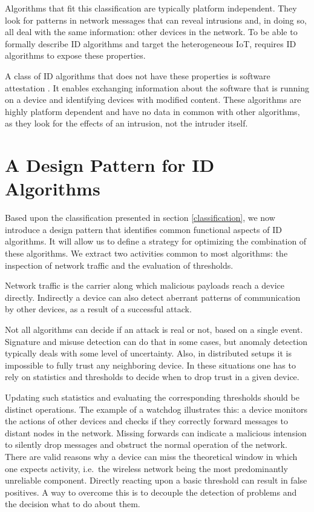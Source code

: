 \documentclass[3p,times,procedia]{elsarticle}
\begin{document}
Algorithms that fit this classification are typically platform independent.
They look for patterns in network messages that can reveal intrusions and, in
doing so, all deal with the same information: other devices in the network. To
be able to formally describe ID algorithms and target the heterogeneous IoT,
\NAME requires ID algorithms to expose these properties.

A class of ID algorithms that does not have these properties is software
attestation \cite{seshadri2008sake}. It enables exchanging information about
the software that is running on a device and identifying devices with modified
content. These algorithms are highly platform dependent and have no data in
common with other algorithms, as they look for the effects of an intrusion, not
the intruder itself.

\section{A Design Pattern for ID Algorithms}
\label{pattern}

Based upon the classification presented in section \ref{classification}, we now
introduce a design pattern that identifies common functional aspects of ID
algorithms. It will allow us to define a strategy for optimizing the
combination of these algorithms. We extract two activities common to most
algorithms: the inspection of network traffic and the evaluation of thresholds.

Network traffic is the carrier along which malicious payloads reach a device
directly. Indirectly a device can also detect aberrant patterns of
communication by other devices, as a result of a successful attack.

Not all algorithms can decide if an attack is real or not, based on a single
event. Signature and misuse detection can do that in some cases, but anomaly
detection typically deals with some level of uncertainty. Also, in distributed
setups it is impossible to fully trust any neighboring device. In these
situations one has to rely on statistics and thresholds to decide when to drop
trust in a given device.

Updating such statistics and evaluating the corresponding thresholds should be
distinct operations. The example of a watchdog \cite{mishra2004intrusion}
illustrates this: a device monitors the actions of other devices and checks if
they correctly forward messages to distant nodes in the network. Missing
forwards can indicate a malicious intension to silently drop messages and
obstruct the normal operation of the network. There are valid reasons why a
device can miss the theoretical window in which one expects activity, i.e.\ the
wireless network being the most predominantly unreliable component. Directly
reacting upon a basic threshold can result in false positives. A way to
overcome this is to decouple the detection of problems and the decision what to
do about them.
\end{document}
